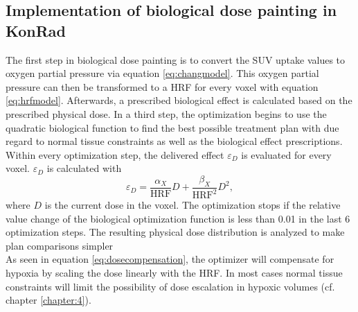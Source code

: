 \subsection{Implementation of biological dose painting in KonRad}
The first step in biological dose painting is to convert the SUV uptake values to oxygen partial pressure via equation \ref{eq:changmodel}. This oxygen partial pressure can then be transformed to a HRF for every voxel with equation \ref{eq:hrfmodel}. Afterwards, a prescribed biological effect is calculated based on the prescribed physical dose. In a third step, the optimization begins to use the quadratic biological function to find the best possible treatment plan with due regard to normal tissue constraints as well as the biological effect prescriptions. Within every optimization step, the delivered effect $\varepsilon_D$  is evaluated for every voxel. $\varepsilon_D$ is calculated with
\begin{equation}
\varepsilon_D = \frac{\alpha_X}{\mathrm{HRF}}D+\frac{\beta_X}{\mathrm{HRF}^2}D^2,
\end{equation}
where $D$ is the current dose in the voxel. The optimization stops if the relative value change of the biological optimization function is less than 0.01 in the last 6 optimization steps. The resulting physical dose distribution is analyzed to make plan comparisons simpler\\As seen in equation \ref{eq:dosecompensation}, the optimizer will compensate for hypoxia by scaling the dose linearly with the HRF. In most cases normal tissue constraints will limit the possibility of dose escalation in hypoxic volumes (cf. chapter \ref{chapter:4}).
